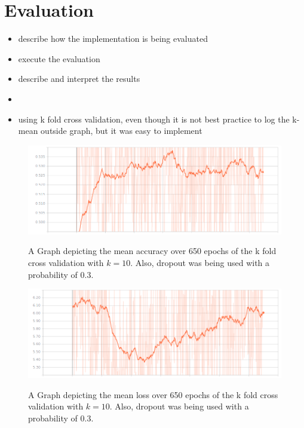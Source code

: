 \section{Evaluation}
\label{sec:evaluation}
\begin{itemize}
	\item describe how the implementation is being evaluated
	\item execute the evaluation
	\item describe and interpret the results
	\item  
	\item using k fold cross validation, even though it is not best practice to log the k-mean outside graph, but it was easy to implement
\end{itemize}

\begin{figure}[!ht]
	\caption{A Graph depicting the mean accuracy over 650 epochs of the k fold cross validation with $k=10$. Also, dropout was being used with a probability of 0.3. }
	\includegraphics[width=0.95\linewidth]{images/evaluation/650-epochs-k-crossvalidation-accuracy-mean.png}
	\label{fig:acc650epochs}
\end{figure}

\begin{figure}[!ht]
	\caption{A Graph depicting the mean loss over 650 epochs of the k fold cross validation with $k=10$. Also, dropout was being used with a probability of 0.3. }
	\includegraphics[width=0.95\linewidth]{images/evaluation/650-epochs-k-crossvalidation-loss-mean.png}
	\label{fig:loss650epochs}
\end{figure}